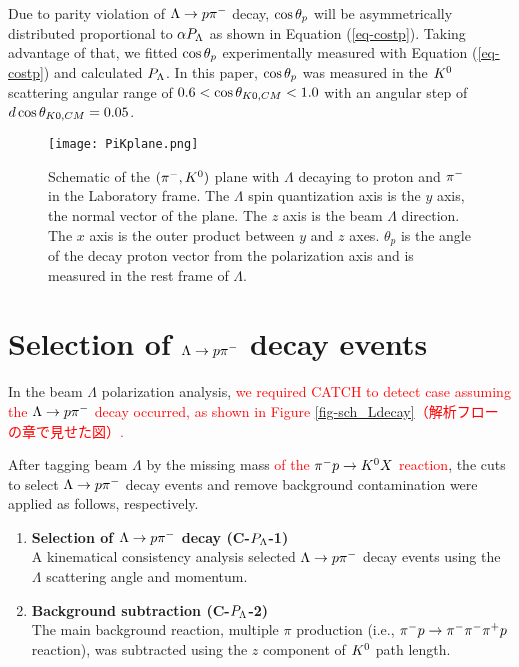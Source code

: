 Due to parity violation of $\Lambda\to p\pi^{-}$ decay, $\cos{\theta_p}$ will be asymmetrically distributed proportional to $\alpha P_{\Lambda}$ \cite{Lee1957} as shown in Equation (\ref{eq-costp}). Taking advantage of that, we fitted $\cos{\theta_p}$ experimentally measured with Equation (\ref{eq-costp}) and calculated $P_{\Lambda}$. In this paper, $\cos{\theta_p}$ was measured in the $K^{0}$ scattering angular range of $0.6<\cos{\theta_{K0,CM}}<1.0$ with an angular step of $d\cos{\theta_{K0,CM}} = 0.05$.


\begin{figure}[h]
  \centering
  \texttt{[image: PiKplane.png]}
  \caption{Schematic of the $(\pi^-,K^0)$ plane with $\Lambda$ decaying to proton and $\pi^{-}$ in the Laboratory frame. The $\Lambda$ spin quantization axis is the $y$ axis, the normal vector of the plane. The $z$ axis is the beam $\Lambda$ direction. The $x$ axis is the outer product between $y$ and $z$ axes. $\theta_p$ is the angle of the decay proton vector from the polarization axis and is measured in the rest frame of $\Lambda$.}
  \label{fig-PiKplane}
\end{figure}


\clearpage
\section{Selection of $\Lambda\to p\pi^{-}$ decay events}
\label{sec-Pl-evsele}

In the beam $\Lambda$ polarization analysis, \textcolor{red}{ we required CATCH to detect case  assuming the $\Lambda\to p\pi^{-}$ decay occurred, as shown in Figure \ref{fig-sch_Ldecay}（解析フローの章で見せた図）. } %

After tagging beam $\Lambda$ by the missing mass \textcolor{red}{of the $\pi^- p \to K^0 X$ reaction}, the cuts to select $\Lambda\to p\pi^{-}$ decay events and remove background contamination were applied as follows, respectively. 


\begin{enumerate}
  \item {\bf Selection of $\Lambda\to p\pi^{-}$ decay ({\bf C-$P_{\Lambda}$-1}) } \\
  A kinematical consistency analysis selected $\Lambda\to p\pi^{-}$ decay events using the $\Lambda$ scattering angle and momentum.
  \item {\bf Background subtraction ({\bf C-$P_{\Lambda}$-2}) } \\
  The main background reaction, multiple $\pi$ production (i.e., $\pi^- p \to \pi^-\pi^-\pi^+p$ reaction), was subtracted using the $z$ component of $K^{0}$ path length. 
\end{enumerate}

